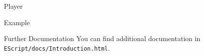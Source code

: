 \documentclass[ucs,9pt]{beamer}
\begin{document}
\begin{frame}{Player}
	\begin{block}{Example}
		
	\end{block}
\end{frame}



\begin{frame}{Further Documentation}
	You can find additional documentation in \texttt{EScript/docs/Introduction.html}.
\end{frame}



\end{document}
